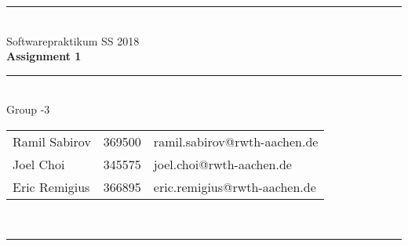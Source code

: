 \documentclass[a4paper,12pt]{article}
\begin{document}
\begin{center}
	\rule{\textwidth}{0.1pt}\\[1cm]
	
	\Large Softwarepraktikum SS 2018\\\bf Assignment 1 %
\end{center}


\begin{center}

	\rule{\textwidth}{0.1pt}\\[0.5cm]

	{\Large Group -3\\[5mm]} %

	\begin{tabular}{lll}
		Ramil Sabirov & 369500 & ramil.sabirov@rwth-aachen.de\\

		Joel Choi & 345575 & joel.choi@rwth-aachen.de \\

		Eric Remigius & 366895 & eric.remigius@rwth-aachen.de \\

	\end{tabular}\\[0.5cm]

	\rule{\textwidth}{0.1pt}\\[1cm]

\end{center}

\newpage
\tableofcontents






\end{document}
